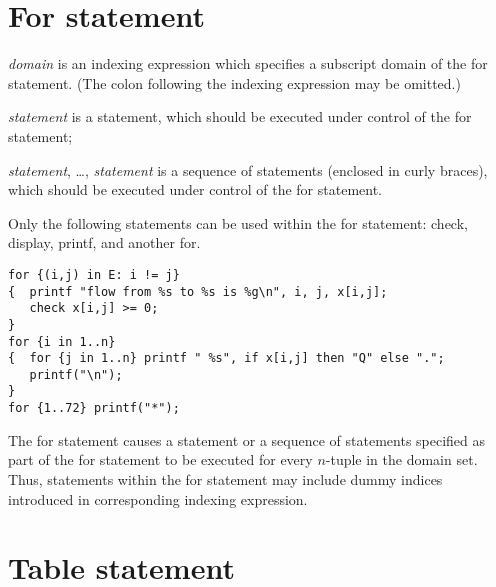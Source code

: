 \documentclass[11pt]{report}
\def\para#1{\noindent{\bf#1}}
\begin{document}
\section{For statement}

\noindent
{}

\medskip

\noindent
{\it domain} is an indexing expression which specifies a subscript
domain of the for statement. (The colon following the indexing
expression may be omitted.)

\noindent
{\it statement} is a statement, which should be executed under control
of the for statement;

\noindent
{\it statement}, \dots, {\it statement} is a sequence of statements
(enclosed in curly braces), which should be executed under control of
the for statement.

Only the following statements can be used within the for statement:
check, display, printf, and another for.

\para{Examples}

\begin{verbatim}
for {(i,j) in E: i != j}
{  printf "flow from %s to %s is %g\n", i, j, x[i,j];
   check x[i,j] >= 0;
}
for {i in 1..n}
{  for {j in 1..n} printf " %s", if x[i,j] then "Q" else ".";
   printf("\n");
}
for {1..72} printf("*");
\end{verbatim}

The for statement causes a statement or a sequence of statements
specified as part of the for statement to be executed for every
$n$-tuple in the domain set. Thus, statements within the for statement
may include dummy indices introduced in corresponding indexing
expression.

\newpage

\section{Table statement}
\end{document}
